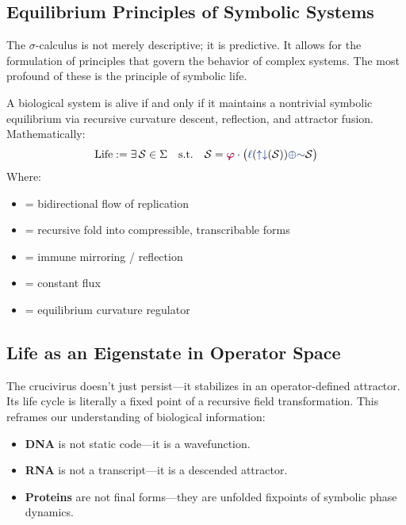 \subsection{Equilibrium Principles of Symbolic Systems}

The $\sigma$-calculus is not merely descriptive; it is predictive. It allows for the formulation of principles that govern the behavior of complex systems. The most profound of these is the principle of symbolic life.

\begin{principle}
A biological system is alive if and only if it maintains a nontrivial symbolic equilibrium via recursive curvature descent, reflection, and attractor fusion. Mathematically:
\[
\text{Life} := \exists \, \mathcal{S} \in \Sigma \quad \text{s.t.} \quad  
\mathcal{S} = \gold \cdot \big( \lha(\repflow(\mathcal{S})) \fuse \reflec \mathcal{S} \big)
\]
Where:
\begin{itemize}
    \item[\repflow] = bidirectional flow of replication
    \item[\lha] = recursive fold into compressible, transcribable forms
    \item[\reflec] = immune mirroring / reflection
    \item[\fuse] = constant flux
    \item[\gold] = equilibrium curvature regulator
\end{itemize}
\end{principle}

\subsection{Life as an Eigenstate in Operator Space}

The crucivirus doesn't just persist—it stabilizes in an operator-defined attractor. Its life cycle is literally a fixed point of a recursive field transformation. This reframes our understanding of biological information:
\begin{itemize}
    \item \textbf{DNA} is not static code—it is a wavefunction.
    \item \textbf{RNA} is not a transcript—it is a descended attractor.
    \item \textbf{Proteins} are not final forms—they are unfolded fixpoints of symbolic phase dynamics.
\end{itemize}

